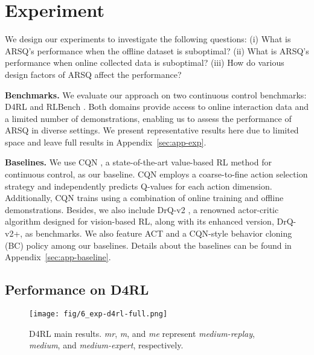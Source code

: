 \section{Experiment}
\label{sec:exp}

We design our experiments to investigate the following questions: 
(i) What is ARSQ's performance when the offline dataset is suboptimal?
(ii) What is ARSQ's performance when online collected data is suboptimal?
(iii) How do various design factors of ARSQ affect the performance?

\textbf{Benchmarks.} We evaluate our approach on two continuous control benchmarks: D4RL \cite{D4RL} and RLBench \cite{RLBench}. Both domains provide access to online interaction data and a limited number of demonstrations, enabling us to assess the performance of ARSQ in diverse settings. We present representative results here due to limited space and leave full results in Appendix~\ref{sec:app-exp}.

\textbf{Baselines.} We use CQN \cite{CQN}, a state-of-the-art value-based RL method for continuous control, as our baseline. CQN employs a coarse-to-fine action selection strategy and independently predicts Q-values for each action dimension. Additionally, CQN trains using a combination of online training and offline demonstrations.
Besides, we also include DrQ-v2 \cite{DrQv2}, a renowned actor-critic algorithm designed for vision-based RL, along with its enhanced version, DrQ-v2+, as benchmarks. 
We also feature ACT \cite{ACT} and a CQN-style behavior cloning (BC) policy among our baselines.
Details about the baselines can be found in Appendix~\ref{sec:app-baseline}.

\subsection{Performance on D4RL}
\label{sec:exp-d4rl}

\begin{figure*}[ht]
    \centering
    \texttt{[image: fig/6\_exp-d4rl-full.png]}
    \vspace{-1em}
    \caption{D4RL main results. \textit{mr}, \textit{m}, and \textit{me} represent \textit{medium-replay}, \textit{medium}, and \textit{medium-expert}, respectively.}
    \label{fig:exp-d4rl-full}
    \vspace{-0.5em}
\end{figure*}

